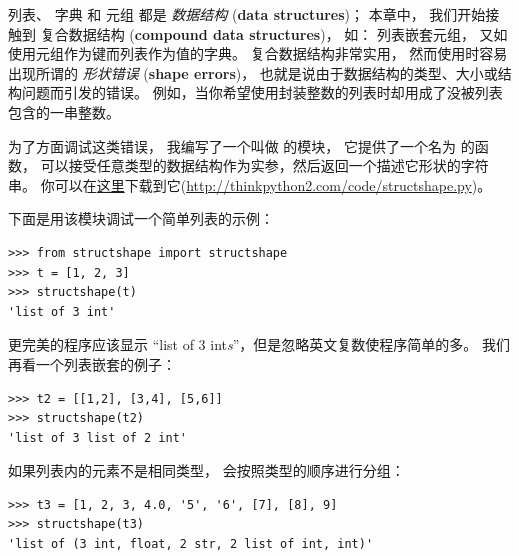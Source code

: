 {列表、  字典 和 元组 都是 {\em 数据结构} ({\bf data structures})； 
本章中， 我们开始接触到 复合数据结构 ({\bf compound data structures})， 
如： 列表嵌套元组， 又如使用元组作为键而列表作为值的字典。  
复合数据结构非常实用， 然而使用时容易出现所谓的 {\em 形状错误} ({\bf shape errors})， 也就是说由于数据结构的类型、大小或结构问题而引发的错误。  
例如，当你希望使用封装整数的列表时却用成了没被列表包含的一串整数。
 


为了方面调试这类错误， 我编写了一个叫做   的模块， 
它提供了一个名为  的函数， 可以接受任意类型的数据结构作为实参，然后返回一个描述它形状的字符串。  
你可以在\href{http://thinkpython2.com/code/structshape.py}{这里}下载到它(\url{http://thinkpython2.com/code/structshape.py})。


下面是用该模块调试一个简单列表的示例：

\begin{lstlisting}
>>> from structshape import structshape
>>> t = [1, 2, 3]
>>> structshape(t)
'list of 3 int'
\end{lstlisting}

%

更完美的程序应该显示 ``list of 3 int{\em s}''，但是忽略英文复数使程序简单的多。  
我们再看一个列表嵌套的例子：

\begin{lstlisting}
>>> t2 = [[1,2], [3,4], [5,6]]
>>> structshape(t2)
'list of 3 list of 2 int'
\end{lstlisting}

%

如果列表内的元素不是相同类型，  会按照类型的顺序进行分组：

\begin{lstlisting}
>>> t3 = [1, 2, 3, 4.0, '5', '6', [7], [8], 9]
>>> structshape(t3)
'list of (3 int, float, 2 str, 2 list of int, int)'
\end{lstlisting}

}
